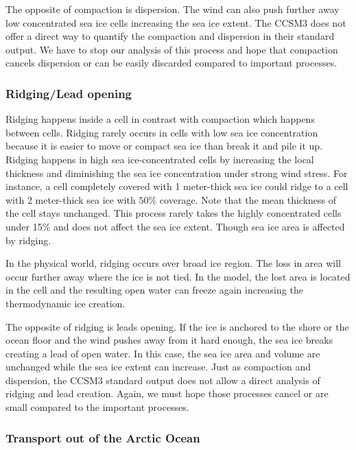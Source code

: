 The opposite of compaction is dispersion. The wind can also push further away low concentrated sea ice cells increasing the sea ice extent. The CCSM3 does not offer a direct way to quantify the compaction and dispersion in their standard output. We have to stop our analysis of this process and hope that compaction cancels dispersion or can be easily discarded compared to important processes.

\subsubsection{Ridging/Lead opening}\label{ridge}

Ridging happens inside a cell in contrast with compaction which happens between cells. Ridging rarely occurs in cells with low sea ice concentration because it is easier to move or compact sea ice than break it and pile it up. Ridging happens in high sea ice-concentrated cells by increasing the local thickness and diminishing the sea ice concentration under strong  wind stress. For instance, a cell completely covered with 1 meter-thick sea ice could ridge to a cell with 2 meter-thick sea ice with $50\%$ coverage. Note that the mean thickness of the cell stays unchanged. This process rarely takes the highly concentrated cells under 15\% and does not affect the sea ice extent. Though sea ice area is affected by ridging.

In the physical world, ridging occurs over broad ice region. The loss in area will occur further away where the ice is not tied. In the model, the lost area is located in the cell and the resulting open water can freeze again increasing the thermodynamic ice creation. 

The opposite of ridging is leads opening. If the ice is anchored to the shore or the ocean floor and the wind pushes away from it hard enough, the sea ice breaks creating a lead of open water. In this case, the sea ice area and volume are unchanged while the sea ice extent can increase. Just as compaction and dispersion, the CCSM3 standard output does not allow a direct analysis of ridging and lead creation. Again, we must hope those processes cancel or are small compared to the important processes. 

\subsubsection{Transport out of the Arctic Ocean}\label{transportsec}

